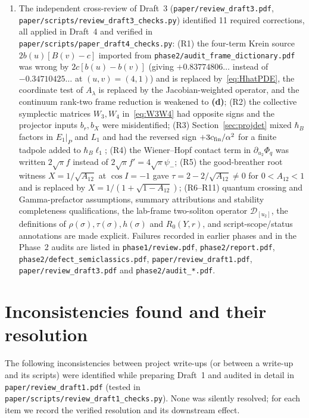 \documentclass[11pt,a4paper]{article}
\newcommand{\lab}[1]{{\normalfont\sffamily\footnotesize\bfseries(#1)}}
\newcommand{\Ld}{\lab{d}}
\newcommand{\scr}[1]{\nolinkurl{#1}}
\newcommand{\hb}{\hbar}
\theoremstyle{remark}
\begin{document}
\begin{enumerate}
\item The independent cross-review of Draft~3 (\scr{paper/review_draft3.pdf}, \nolinkurl{paper/scripts/review_draft3_checks.py}) identified 11 required corrections, all applied in Draft~4 and verified in \nolinkurl{paper/scripts/paper_draft4_checks.py}: (R1) the four-term Krein source $2b(u)[B(v)-c]$ imported from \scr{phase2/audit_frame_dictionary.pdf} was wrong by $2c[b(u)-b(v)]$ (giving $+0.83774806\ldots$ instead of $-0.34710425\ldots$ at $(u,v)=(4,1)$) and is replaced by~\eqref{eq:HhatPDE}, the coordinate test of $A_\lambda$ is replaced by the Jacobian-weighted operator, and the continuum rank-two frame reduction is weakened to \Ld; (R2) the collective symplectic matrices $W_3,W_4$ in~\eqref{eq:W3W4} had opposite signs and the projector inputs $b_r,b_X$ were misidentified; (R3) Section~\ref{sec:projdet} mixed $\hb_B$ factors in $E_1|_P$ and $L_1$ and had the reversed sign $+3c_{\rm fin}/\alpha^2$ for a finite tadpole added to $\hb_B\ell_1$; (R4) the Wiener--Hopf contact term in $\partial_{u_2}\Phi_q$ was written $2\sqrt\pi f$ instead of $2\sqrt\pi f'=4\sqrt\pi\psi_-$; (R5) the good-breather root witness $X=1/\sqrt{A_{12}}$ at $\cos I=-1$ gave $\tau=2-2/\sqrt{A_{12}}\neq0$ for $0<A_{12}<1$ and is replaced by $X=1/(1+\sqrt{1-A_{12}})$; (R6--R11) quantum crossing and Gamma-prefactor assumptions, summary attributions and stability completeness qualifications, the lab-frame two-soliton operator $\mathcal D_{[u_2]}$, the definitions of $\rho(\sigma),\tau(\sigma),h(\sigma)$ and $R_0(Y,r)$, and script-scope/status annotations are made explicit. Failures recorded in earlier phases and in the Phase~2 audits are listed in \scr{phase1/review.pdf}, \scr{phase2/report.pdf}, \scr{phase2/defect_semiclassics.pdf}, \scr{paper/review_draft1.pdf}, \scr{paper/review_draft3.pdf} and \scr{phase2/audit\_*.pdf}.
\end{enumerate}

\section{Inconsistencies found and their resolution}\label{app:incons}

The following inconsistencies between project write-ups (or between a write-up and its scripts) were identified while preparing Draft~1 and audited in detail in \scr{paper/review_draft1.pdf} (tested in \scr{paper/scripts/review_draft1_checks.py}). None was silently resolved; for each item we record the verified resolution and its downstream effect.
\end{document}
